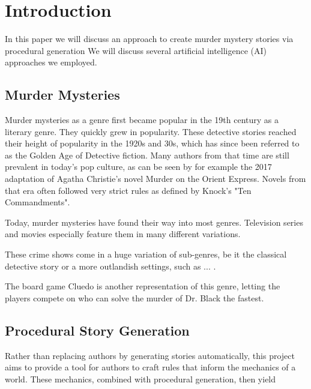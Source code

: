 \section{Introduction} \label{introduction}

In this paper we will discuss an approach to create murder mystery stories via procedural generation
We will discuss several artificial intelligence (AI) approaches we employed.

\subsection{Murder Mysteries}

Murder mysteries as a genre first became popular in the 19th century as a literary genre.
They quickly grew in popularity.
These detective stories reached their height of popularity in the 1920s and 30s, which has since been referred to as the Golden Age of Detective fiction.
Many authors from that time are still prevalent in today's pop culture, as can be seen by for example the 2017 adaptation of Agatha Christie's novel Murder on the Orient Express.
Novels from that era often followed very strict rules as defined by Knock's "Ten Commandments".

Today, murder mysteries have found their way into most genres.
Television series and movies especially feature them in many different variations.

These crime shows come in a huge variation of sub-genres, be it the classical detective story or a more outlandish settings, such as ... .

The board game Cluedo is another representation of this genre, letting the players compete on who can solve the murder of Dr. Black the fastest.

\subsection{Procedural Story Generation}
Rather than replacing authors by generating stories automatically, this project aims to provide a tool for authors to craft rules that inform the mechanics of a world.
These mechanics, combined with procedural generation, then yield 
